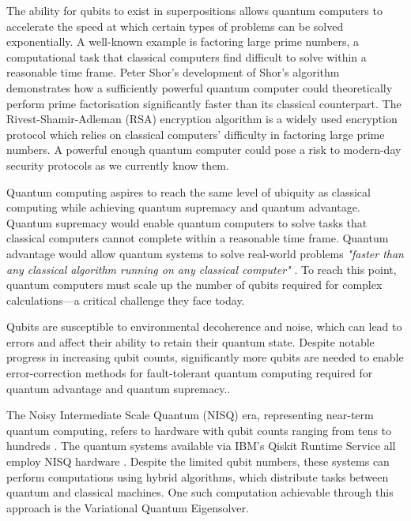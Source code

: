 \documentclass{article}
\begin{document}
{The ability for qubits to exist in superpositions allows quantum computers to accelerate the speed at which certain types of problems can be solved exponentially\cite{knowledgeacademy}. A well-known example is factoring large prime numbers, a computational task that classical computers find difficult to solve within a reasonable time frame. Peter Shor’s development of Shor’s algorithm demonstrates how a sufficiently powerful quantum computer could theoretically perform prime factorisation significantly faster than its classical counterpart\cite{Shor_1997}\cite{minutephysics}. The Rivest-Shamir-Adleman (RSA) encryption algorithm is a widely used encryption protocol which relies on classical computers' difficulty in factoring large prime numbers\cite{encryptionconsulting}. A powerful enough quantum computer could pose a risk to modern-day security protocols as we currently know them. 

Quantum computing aspires to reach the same level of ubiquity as classical computing while achieving quantum supremacy and quantum advantage. Quantum supremacy would enable quantum computers to solve tasks that classical computers cannot complete within a reasonable time frame\cite{quera}. Quantum advantage would allow quantum systems to solve real-world problems \textit{"faster than any classical algorithm running on any classical computer"} \cite{quera}. To reach this point, quantum computers must scale up the number of qubits required for complex calculations—a critical challenge they face today.

Qubits are susceptible to environmental decoherence and noise, which can lead to errors and affect their ability to retain their quantum state\cite{futurumcareers}. Despite notable progress in increasing qubit counts, significantly more qubits are needed to enable error-correction methods for fault-tolerant quantum computing required for quantum advantage and quantum supremacy.\cite{NewScientist}.

The Noisy Intermediate Scale Quantum (NISQ) era, representing near-term quantum computing, refers to hardware with qubit counts ranging from tens to hundreds \cite{NISQ}. The quantum systems available via IBM's Qiskit Runtime Service all employ NISQ hardware \cite{ReleaseSummary}. Despite the limited qubit numbers, these systems can perform computations using hybrid algorithms, which distribute tasks between quantum and classical machines. One such computation achievable through this approach is the Variational Quantum Eigensolver.

}
\end{document}
